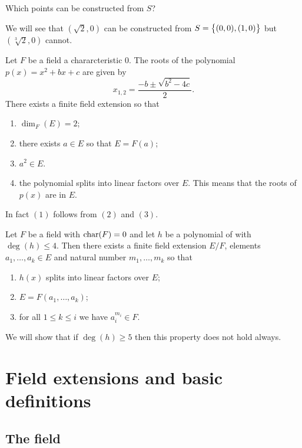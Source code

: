 \documentclass[11pt,a4paper]{article}
\begin{document}
\begin{question}
  Which points can be constructed from $S$?
\end{question}
\begin{remark}
  We will see that $(\sqrt{2},0)$ can be constructed from
  $S = \left\{(0,0),(1,0)\right\}$ but $(\sqrt[3]{2},0)$ cannot.
\end{remark}

\begin{remark}
  Let $F$ be a field a chararcteristic $0$.
  The roots of the polynomial $p(x) = x^2 + bx + c$ are given by
  \[
    x_{1,2} = \frac{-b \pm \sqrt{b^2 - 4c}}{2}.
  \]
  There exists a finite field extension so that
  \begin{enumerate}
    \item[(1)] $\dim_F(E) = 2$;
    \item[(2)] there exists $a \in E$ so that $E = F(a)$;
    \item[(3)] $a^2 \in E$.
    \item[(4)] the polynomial splits into linear factors over $E$.
      This means that the roots of $p(x)$ are in $E$.
  \end{enumerate}
  In fact $(1)$ follows from $(2)$ and $(3)$.
\end{remark}

\begin{remark}
  Let $F$ be a field with $\text{char}(F) = 0$ and
  let $h$ be a polynomial of with $\deg(h) \le 4$.
  Then there exists a finite field extension $E/F$,
  elements $a_1,\dots,a_k \in E$ and
  natural number $m_1,\dots,m_k$ so that
  \begin{enumerate}
    \item[(1)] $h(x)$ splits into linear factors over $E$;
    \item[(2)] $E = F(a_1,\dots,a_k)$;
    \item[(3)] for all $1 \le k \le i$ we have $a_i^{m_i} \in F$.
  \end{enumerate}
  We will show that if $\deg(h) \geq 5$ then this property does not
  hold always.
\end{remark}

\newpage

\section{Field extensions and basic definitions}
\subsection{The field}
\end{document}
